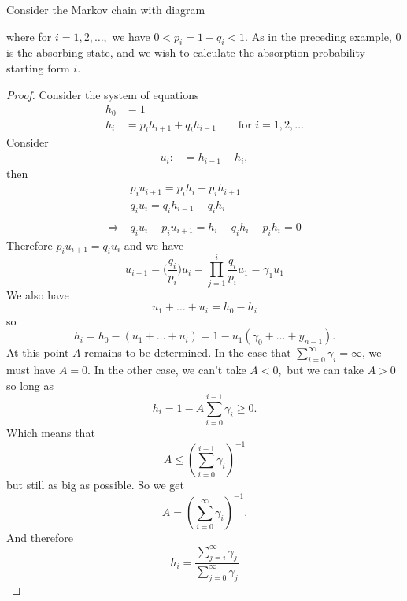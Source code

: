 \begin{thm}[Example 1.3.4]
Consider the Markov chain with diagram


where for \(i=1,2,\ldots ,\) we have $0<p_{i}=1-q_{i}<1$. As in the preceding example, $0$ is the absorbing state, and we wish to calculate the absorption probability starting form $i$.
\end{thm}

\begin{proof}
Consider the system of equations
\begin{align*}
h_{0}&=1 \\
h_{i}&=p_{i}h_{i+1}+q_{i}h_{i-1} \qquad\text{for }i=1,2,\ldots 
\end{align*}
Consider
\begin{align*}
u_{i}:&=h_{i-1}-h_{i},
\end{align*}
then
\begin{align*}
&p_{i}u_{i+1}=p_{i}h_{i}-p_{i}h_{i+1}\\
&q_{i}u_{i}=q_{i}h_{i-1}-q_{i}h_{i} \\ \\
\Longrightarrow \  &q_{i}u_{i}-p_{i}u_{i+1}=h_{i}-q_{i}h_{i}-p_{i}h_{i}=0
\end{align*}
Therefore \(p_{i}u_{i+1}=q_{i}u_{i}\) and we have
\[
u_{i+1}=\Big(\frac{q_{i}}{p_{i}}\Big)u_{i}=\prod _{j=1}^i \frac{q_{i}}{p_{i}}u_{1}=\gamma _{1}u_{1}
\]
We also have
\[
u_{1}+\ldots +u_{i}=h_{0}-h_{i}
\]
so
\[
h_{i}=h_{0}-(u_{1}+\ldots +u_{i})=1-u_{1}(\gamma _{0}+\ldots +y_{n-1}).
\]
At this point \(A\) remains to be determined. In the case that \(\sum _{i=0}^\infty \gamma _{i}=\infty \), we must have \(A=0.\) In the other case, we can't take \(A<0,\) but we can take $A>0$ so long as
\[
h_{i}=1-A\sum _{i=0}^{i-1}\gamma _{i} \geq 0.
\]
Which means that
\[
A\leq (\sum _{i=0}^{i-1}\gamma _{i})^{-1}
\]
but still as big as possible. So we get
\[
A=(\sum _{i=0}^{\infty }\gamma _{i})^{-1}.
\]
And therefore
\[
h_{i}=\frac{\sum _{j=i}^{\infty }\gamma _{j}}{\sum _{j=0}^{\infty }\gamma _{j} }
\]
\end{proof}

